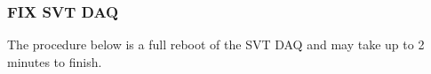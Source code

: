 \documentclass[12pt]{article}
\begin{document}
\subsubsection{FIX SVT DAQ}
\label{fixsvtdaq}




The procedure below is a full reboot of the SVT DAQ and may take up to 2 minutes to finish. 
\end{document}
